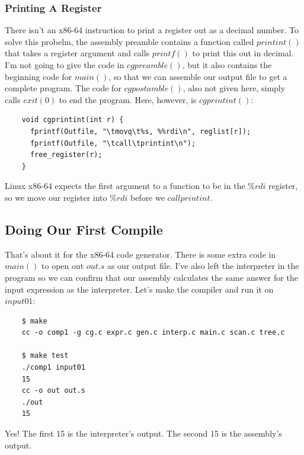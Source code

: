 \documentclass[journal, onecolumn, 12pt]{IEEEtran}
\begin{document}
\subsubsection{Printing A Register}

There isn't an x86-64 instruction to print a register out as a decimal number. To solve this probelm, the assembly preamble contains a function called $printint()$ that takes a register argument and calls $printf()$ to print this out in decimal.
I'm not going to give the code in $cgpreamble()$, but it also contains the beginning code for $main()$, so that we can assemble our output file to get a complete program. The code for $cgpostamble()$, also not given here, simply calls $exit(0)$ to end the program. Here, however, is $cgprintint()$:

\begin{lstlisting}
    void cgprintint(int r) {
      fprintf(Outfile, "\tmovq\t%s, %%rdi\n", reglist[r]);
      fprintf(Outfile, "\tcall\tprintint\n");
      free_register(r);
    }
\end{lstlisting}

Linux x86-64 expects the first argument to a function to be in the $\%rdi$ register, so we move our register into $\%rdi$ before we $call printint$.

\subsection{Doing Our First Compile}

That's about it for the x86-64 code generator. There is some extra code in $main()$ to open out $out.s$ as our output file. I've also left the interpreter in the program so we can confirm that our assembly calculates the same answer for the input expression as the interpreter. Let's make the compiler and run it on $input 01$:

\begin{lstlisting}
    $ make
    cc -o comp1 -g cg.c expr.c gen.c interp.c main.c scan.c tree.c
    
    $ make test
    ./comp1 input01
    15
    cc -o out out.s
    ./out
    15
\end{lstlisting}

Yes! The first 15 is the interpreter's output. The second 15 is the assembly's output.
\end{document}
